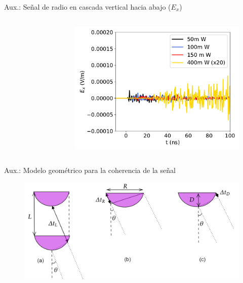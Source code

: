 \documentclass{beamer}
\begin{document}
\begin{frame}[noframenumbering]{Aux.: Señal de radio en cascada vertical hacia abajo ($E_x$)}
\begin{columns}
\begin{figure}[H]
		\end{figure}
		\begin{figure}[H]
			\centering
			\includegraphics[width=.8\linewidth]{figures/radio/p_1e17_0deg_NS_W_v2}
		\end{figure}
	\end{columns}
\end{frame}
\begin{frame}[noframenumbering]{Aux.: Modelo geométrico para la coherencia de la señal}
	\begin{figure}[H]
		\centering
		\includegraphics[width=1\linewidth]{figures/radio/coherence_v2}
	\end{figure}
\end{frame}
\end{document}
